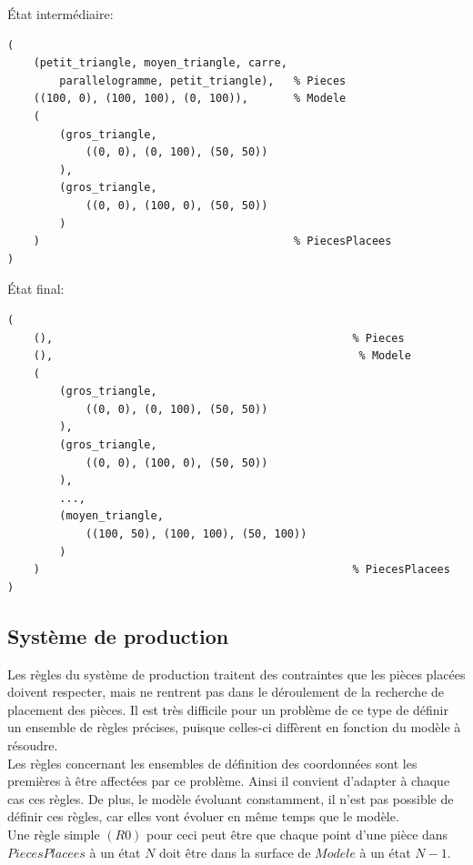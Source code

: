 \documentclass[a4paper, 11pt]{report}
\begin{document}
État intermédiaire:\\
\begin{verbatim}
(
    (petit_triangle, moyen_triangle, carre,					
        parallelogramme, petit_triangle),   % Pieces
    ((100, 0), (100, 100), (0, 100)),       % Modele							   
    (														
        (gros_triangle, 
            ((0, 0), (0, 100), (50, 50))
        ),
        (gros_triangle, 
            ((0, 0), (100, 0), (50, 50))
        )
    )                                       % PiecesPlacees
)
\end{verbatim}


État final:\\
\begin{verbatim}
(
    (),                                              % Pieces												
    (),	                                              % Modele										
    (													   
        (gros_triangle,
            ((0, 0), (0, 100), (50, 50))
        ),
        (gros_triangle, 
            ((0, 0), (100, 0), (50, 50))
        ),
        ...,
        (moyen_triangle,
            ((100, 50), (100, 100), (50, 100))
        )
    )                                                % PiecesPlacees
)
\end{verbatim}

			\subsection{Système de production}

		Les règles du système de production traitent des contraintes que les pièces placées doivent respecter, mais ne rentrent pas dans le déroulement de la recherche de placement des pièces. Il est très difficile pour un problème de ce type de définir un ensemble de règles précises, puisque celles-ci diffèrent en fonction du modèle à résoudre.\\
		Les règles concernant les ensembles de définition des coordonnées sont les premières à être affectées par ce problème. Ainsi il convient d'adapter à chaque cas ces règles. De plus, le modèle évoluant constamment, il n'est pas possible de définir ces règles, car elles vont évoluer en même temps que le modèle. \\
Une règle simple $(R0)$ pour ceci peut être que chaque point d'une pièce dans $PiecesPlacees$ à un état $N$ doit
être dans la surface de $Modele$ à un état $N-1$.\\
\end{document}
